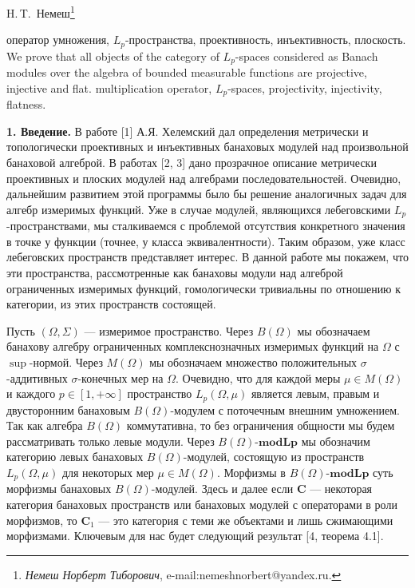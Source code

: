 \documentclass[11pt,twoside]{article}
\begin{document}
\cleanbegin

\def\udk{517.986.225}
{H.\,T.~Немеш\footnote[1] {{\it Немеш Норберт Тиборович},
        e-mail:nemeshnorbert@yandex.ru.}}


 {оператор умножения, $L_p$-пространства, проективность,
    инъективность, плоскость.} {We prove that all objects of the category of
    $L_p$-spaces considered as Banach modules over the algebra of bounded
    measurable functions are projective, injective and flat.} {multiplication
    operator, $L_p$-spaces, projectivity, injectivity, flatness.}


\textbf{1. Введение.} В работе [1] А.Я. Хелемский дал определения метрически и
топологически проективных и инъективных банаховых модулей над произвольной
банаховой алгеброй. В работах [2, 3] дано прозрачное описание метрически
проективных и плоских модулей над алгебрами последовательностей. Очевидно,
дальнейшим развитием этой программы было бы решение аналогичных задач для алгебр
измеримых функций. Уже в случае модулей, являющихся лебеговскими
$L_p$-пространствами, мы сталкиваемся с проблемой отсутствия конкретного
значения в точке у функции (точнее, у класса эквивалентности). Таким образом,
уже класс лебеговских пространств представляет интерес. В данной работе мы
покажем, что эти пространства, рассмотренные как банаховы модули над алгеброй
ограниченных измеримых функций, гомологически тривиальны по отношению к
категории, из этих пространств состоящей.

Пусть $(\Omega,\Sigma)$ --- измеримое пространство. Через $B(\Omega)$ мы
обозначаем банахову алгебру ограниченных комплекснозначных измеримых функций на
$\Omega$ с $\sup$-нормой. Через $M(\Omega)$ мы обозначаем множество
положительных $\sigma$-аддитивных $\sigma$-конечных мер на $\Omega$. Очевидно,
что для каждой меры $\mu\in M(\Omega)$ и каждого $p\in[1,+\infty]$ пространство
$L_p(\Omega,\mu)$ является левым, правым и двусторонним банаховым
$B(\Omega)$-модулем с поточечным внешним умножением. Так как алгебра $B(\Omega)$
коммутативна, то без ограничения общности мы будем рассматривать только левые
модули. Через $B(\Omega)$-$\mathbf{modLp}$ мы обозначим категорию левых
банаховых $B(\Omega)$-модулей, состоящую из пространств $L_p(\Omega,\mu)$ для
некоторых мер $\mu\in M(\Omega)$. Морфизмы в $B(\Omega)$-$\mathbf{modLp}$ суть
морфизмы банаховых $B(\Omega)$-модулей. Здесь и далее если $\mathbf{C}$ ---
некоторая категория банаховых пространств или банаховых модулей с операторами в
роли морфизмов, то $\mathbf{C}_1$ --- это категория с теми же объектами и лишь
сжимающими морфизмами. Ключевым для нас будет следующий результат [4, теорема
4.1].
\end{document}
